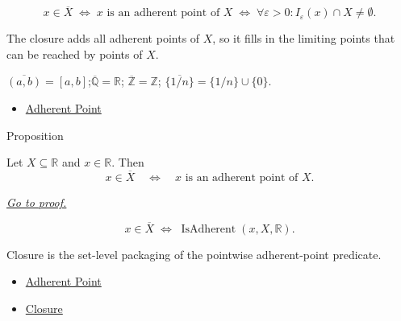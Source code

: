 \begin{remark*}
\[
  x \in \overline{X}
  \;\iff\;
  x\text{ is an adherent point of }X
  \;\iff\;
  \forall\varepsilon>0 : I_\varepsilon(x)\cap X\neq\emptyset.
\]
\end{remark*}

\begin{remark*}[Interpretation]
The closure adds all adherent points of $X$, so it fills in the limiting
points that can be reached by points of $X$.


$\overline{(a,b)} = [a,b]$;\quad $\overline{\mathbb{Q}} = \mathbb{R}$;\quad
$\overline{\mathbb{Z}} = \mathbb{Z}$;\quad
$\overline{\{1/n\}} = \{1/n\}\cup\{0\}$.
\end{remark*}

\begin{dependencies}
\begin{itemize}
  \item \hyperref[def:adherent-point-r]{Adherent Point}
\end{itemize}
\end{dependencies}

\begin{propositionbox}{Proposition}
\begin{proposition}
\label{prop:adherent-points-are-closure-points}
Let \(X\subseteq\mathbb{R}\) and \(x\in\mathbb{R}\).  Then
\[
  x\in\overline{X}
  \quad\Longleftrightarrow\quad
  x\text{ is an adherent point of }X.
\]

\smallskip\noindent
\hyperref[prf:adherent-points-are-closure-points]{\textit{Go to proof.}}
\end{proposition}
\end{propositionbox}

\begin{remark*}
\[
  x\in\overline{X}
  \;\Longleftrightarrow\;
  \operatorname{IsAdherent}(x,X,\mathbb{R}).
\]
\end{remark*}

\begin{remark*}[Interpretation]
Closure is the set-level packaging of the pointwise adherent-point predicate.
\end{remark*}

\begin{dependencies}
\begin{itemize}
  \item \hyperref[def:adherent-point-r]{Adherent Point}
  \item \hyperref[def:closure-r]{Closure}
\end{itemize}
\end{dependencies}

